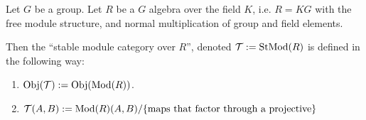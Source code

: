\begin{definition}\label{def:stable_module_category}
    Let \( G \) be a group. Let \( R \) be a \( G \) algebra over the field \( K \), i.e. \( R = KG \) with the free module structure, and normal multiplication of group and field elements.

    Then the ``stable module category over \( R \)'', denoted \( {\mathcal{T}} := \operatorname{StMod}(R) \) is defined in the following way:
    \begin{enumerate}
        \item \( \operatorname{Obj}({\mathcal{T}}) := \operatorname{Obj}(\operatorname{Mod}(R)) \).
        \item \( {\mathcal{T}}(A, B) := \operatorname{Mod}(R)(A, B)/\{\text{maps that factor through a projective}\} \)
    \end{enumerate}
\end{definition}

